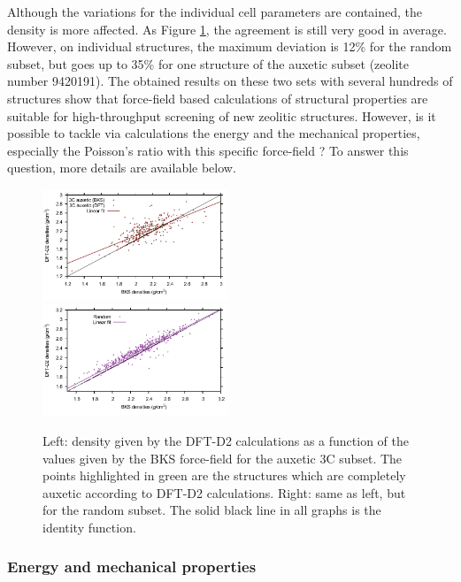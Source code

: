 \documentclass[journal=jacsat,manuscript=article]{achemso}
\begin{document}
Although the variations for the individual cell parameters are contained, the density is more affected. As Figure \ref{corr_dens}, the agreement is still very good in average. However, on individual structures, the maximum deviation is 12\% for the random subset, but goes up to 35\% for one structure of the auxetic subset (zeolite number 9420191). The obtained results on these two sets with several hundreds of structures show that force-field based calculations of structural properties are suitable for high-throughput screening of new zeolitic structures. However, is it possible to tackle via calculations the energy and the mechanical properties, especially the Poisson's ratio with this specific force-field ? To answer this question, more details are available below. 
			
\begin{figure}[ht!]\centering
\includegraphics[clip,trim=0.09cm 0.25cm 0.25cm 0.25cm,width=0.495\textwidth]{zeolite_study_5_1}
\includegraphics[clip,trim=0.09cm 0.25cm 0.25cm 0.25cm,width=0.495\textwidth]{zeolite_study_5_2}
\caption{Left: density given by the DFT-D2 calculations as a function of the values given by the BKS force-field for the auxetic 3C subset. The points highlighted in green are the structures which are completely auxetic according to DFT-D2 calculations. Right: same as left, but for the random subset. The solid black line in all graphs is the identity function.
\label{corr_dens}}
\end{figure}

			
\subsubsection{Energy and mechanical properties}
			
\end{document}
